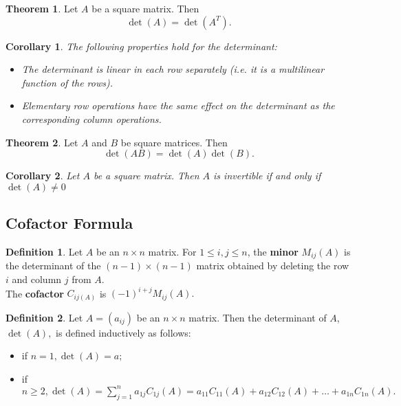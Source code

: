 \documentclass[12pt, a4paper]{article}
\theoremstyle{definition}
\newtheorem{definition}{Definition}[section]
\newtheorem{theorem}{Theorem}[section]
\theoremstyle{plain}
\newtheorem{corollary}{Corollary}[theorem]
\begin{document}
\begin{theorem} Let $A$ be a square matrix. Then $$\det{(A)}=\det{(A^T)}.$$
\end{theorem}

\begin{corollary} The following properties hold for the determinant: 
\begin{itemize}
	\item The determinant is linear in each row separately (i.e. it is a multilinear function of the rows).
	\item Elementary row operations have the same effect on the determinant as the corresponding column operations.
\end{itemize}
\end{corollary}

\begin{theorem} Let $A$ and $B$ be square matrices. Then $$\det{(AB)}=\det{(A)}\det{(B)}.$$ \end{theorem}

\begin{corollary} Let $A$ be a square matrix. Then $A$ is invertible if and only if $\det(A) \neq 0$ \end{corollary}

\subsection{Cofactor Formula}

\begin{definition} Let $A$ be an $n\times n$ matrix. For $1 \leq i,j \leq n$, the \textbf{minor} $M_{ij}(A)$ is the determinant of the $(n - 1) \times (n -1)$ matrix obtained by deleting the row $i$ and column $j$ from $A.$ \\
The \textbf{cofactor} $C_{ij(A)}$ is $(-1)^{i+j}M_{ij}(A).$
\end{definition}

\begin{tcolorbox}
\begin{definition}
Let $A = (a_{ij})$ be an $n\times n$ matrix. Then the determinant of $A$, $\det(A),$ is defined inductively as follows:
\begin{itemize}
	\item if $n=1, \det{(A)}=a;$
	\item if $n\geq2, \det{(A)}=\sum_{j=1}^{n} a_{1j}C_{1j}(A)=a_{11}C_{11}(A)+a_{12}C_{12}(A)+\ldots+a_{1n}C_{1n}(A).$
\end{itemize}
\end{definition}
\end{tcolorbox}
\end{document}
